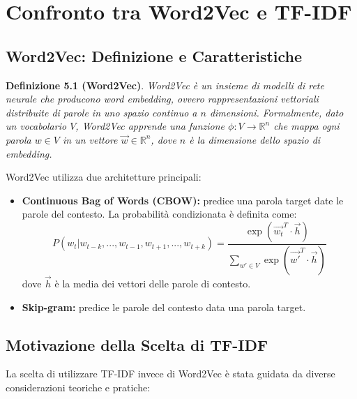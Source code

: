 \section{Confronto tra Word2Vec e TF-IDF}

\subsection{Word2Vec: Definizione e Caratteristiche}
\textbf{Definizione 5.1 (Word2Vec)}. \textit{Word2Vec è un insieme di modelli di rete neurale che producono word embedding, ovvero rappresentazioni vettoriali distribuite di parole in uno spazio continuo a \(n\) dimensioni. Formalmente, dato un vocabolario \(V\), Word2Vec apprende una funzione \(\phi: V \rightarrow \mathbb{R}^n\) che mappa ogni parola \(w \in V\) in un vettore \(\vec{w} \in \mathbb{R}^n\), dove \(n\) è la dimensione dello spazio di embedding.}

Word2Vec utilizza due architetture principali:
\begin{itemize}
    \item \textbf{Continuous Bag of Words (CBOW):} predice una parola target date le parole del contesto. La probabilità condizionata è definita come:
    \[
    P(w_t|w_{t-k}, ..., w_{t-1}, w_{t+1}, ..., w_{t+k}) = \frac{\exp(\vec{w_t}^T \cdot \vec{h})}{\sum_{w' \in V} \exp(\vec{w'}^T \cdot \vec{h})}
    \]
    dove \(\vec{h}\) è la media dei vettori delle parole di contesto.

    \item \textbf{Skip-gram:} predice le parole del contesto data una parola target.
\end{itemize}

\subsection{Motivazione della Scelta di TF-IDF}
La scelta di utilizzare TF-IDF invece di Word2Vec è stata guidata da diverse considerazioni teoriche e pratiche:

